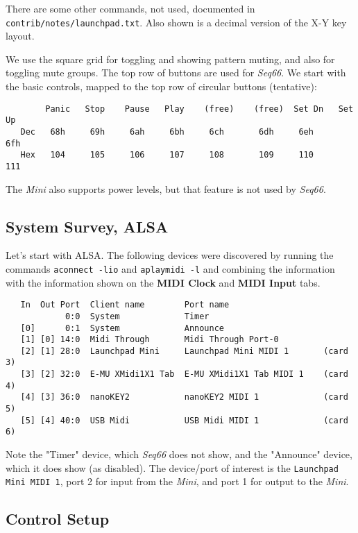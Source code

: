    There are some other commands, not used, documented in
   \texttt{contrib/notes/launchpad.txt}.
   Also shown is a decimal version of the X-Y key layout.

   We use the square grid for toggling and showing pattern muting, and also for
   toggling mute groups.
   The top row of buttons are used for \textsl{Seq66}. We start with the basic
   controls, mapped to the top row of circular buttons (tentative):

   \begin{verbatim}
        Panic   Stop    Pause   Play    (free)    (free)  Set Dn   Set Up
   Dec   68h     69h     6ah     6bh     6ch       6dh     6eh      6fh
   Hex   104     105     106     107     108       109     110      111
   \end{verbatim}

   The \textsl{Mini}
   also supports power levels, but that feature is not used by
   \textsl{Seq66}.

\subsection{System Survey, ALSA}
\label{subsec:launchpad_mini_survey_alsa}

   Let's start with ALSA.  The following devices were discovered by running the
   commands \texttt{aconnect -lio} and \texttt{aplaymidi -l} and combining the
   information with the information shown on the
   \textbf{MIDI Clock} and \textbf{MIDI Input} tabs.

   \begin{verbatim}
   In  Out Port  Client name        Port name
            0:0  System             Timer
   [0]      0:1  System             Announce
   [1] [0] 14:0  Midi Through       Midi Through Port-0
   [2] [1] 28:0  Launchpad Mini     Launchpad Mini MIDI 1       (card 3)
   [3] [2] 32:0  E-MU XMidi1X1 Tab  E-MU XMidi1X1 Tab MIDI 1    (card 4)
   [4] [3] 36:0  nanoKEY2           nanoKEY2 MIDI 1             (card 5)
   [5] [4] 40:0  USB Midi           USB Midi MIDI 1             (card 6)
   \end{verbatim}

   Note the "Timer" device, which \textsl{Seq66} does not show, and the
   "Announce" device, which it does show (as disabled).  The device/port of
   interest is the \texttt{Launchpad Mini MIDI 1}, port 2 for input from
   the \textsl{Mini}, and port 1 for output to the \textsl{Mini}.

\subsection{Control Setup}
\label{subsec:launchpad_mini_control_setup}

